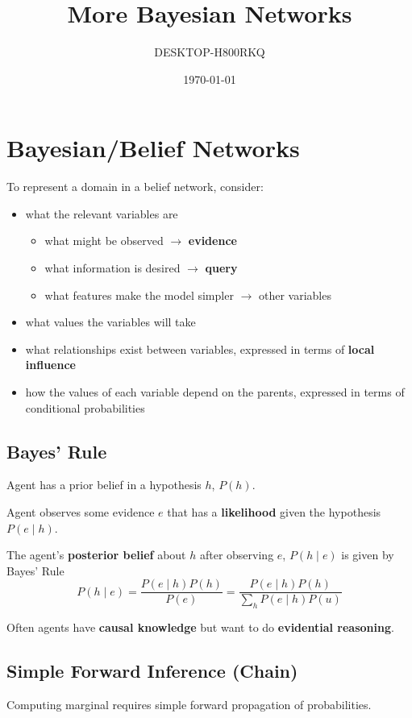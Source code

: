 \documentclass[11pt]{article}
\author{DESKTOP-H800RKQ}
\date{\today}
\title{More Bayesian Networks}
\begin{document}
\maketitle
\tableofcontents

\section{Bayesian/Belief Networks}
\label{sec:org7a2eb1f}
To represent a domain in a belief network, consider:
\begin{itemize}
\item what the relevant variables are
\begin{itemize}
\item what might be observed \(\to\) \textbf{evidence}
\item what information is desired \(\to\) \textbf{query}
\item what features make the model simpler \(\to\) other variables
\end{itemize}
\item what values the variables will take
\item what relationships exist between variables, expressed in terms of \textbf{local influence}
\item how the values of each variable depend on the parents, expressed in terms of conditional probabilities
\end{itemize}
\subsection{Bayes' Rule}
\label{sec:orgb947e83}
Agent has a prior belief in a hypothesis \(h\), \(P(h)\).

Agent observes some evidence \(e\) that has a \textbf{likelihood} given the hypothesis \(P(e \mid h)\).

The agent's \textbf{posterior belief} about \(h\) after observing \(e\), \(P(h \mid e)\)
is given by Bayes' Rule
$$ P(h \mid e) = \frac{P(e \mid h) P(h)}{P(e)} = \frac{P(e \mid h) P(h)}{\sum_{h} P(e \mid h) P(u)} $$

Often agents have \textbf{causal knowledge} but want to do \textbf{evidential reasoning}.
\subsection{Simple Forward Inference (Chain)}
\label{sec:orgd948140}
Computing marginal requires simple forward propagation of probabilities.
\end{document}
